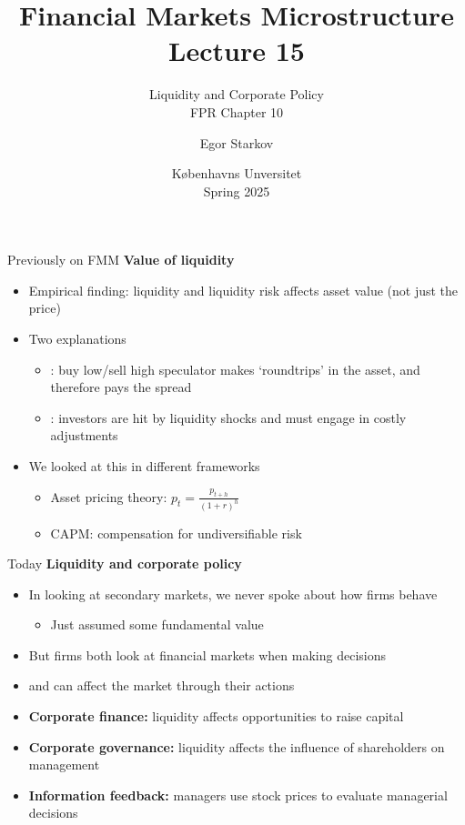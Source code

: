 \documentclass[english,10pt
,aspectratio=169
]{beamer}
\title{Financial Markets Microstructure \\ Lecture 15}
\subtitle{Liquidity and Corporate Policy \\ FPR Chapter 10}
\author{Egor Starkov}
\date{K{\o}benhavns Unversitet \\
	Spring 2025}
\begin{document}
\frame[plain]{\titlepage}


\begin{frame}{Previously on FMM}
	\textbf{Value of liquidity}
	\begin{itemize}
		\item Empirical finding: liquidity and liquidity risk affects asset value (not just the price)
		\item Two explanations
		\begin{itemize}
			\item {}: buy low/sell high speculator makes `roundtrips' in the asset, and therefore pays the spread
			\item {}: investors are hit by liquidity shocks and must engage in costly adjustments
		\end{itemize}
		\item We looked at this in different frameworks
		\begin{itemize}
			\item \alert{Asset pricing theory}: $p_{t}= \frac{p_{t+h}}{(1+r)^{h}}$
			\item \alert{CAPM}: compensation for undiversifiable risk
		\end{itemize}
	\end{itemize}
\end{frame}


\begin{frame}{Today}
	\textbf{Liquidity and corporate policy}
	\begin{itemize}
		\item In looking at secondary markets, we never spoke about how firms behave
		\begin{itemize}
			\item Just assumed some fundamental value
		\end{itemize}
		\item But firms both look at financial markets when making decisions
		\item and can affect the market through their actions
		\pause\bigskip 
		\item \textbf{Corporate finance:} liquidity affects opportunities to raise capital
		\item \textbf{Corporate governance:} liquidity affects the influence of shareholders on management
		\item \textbf{Information feedback:} managers use stock prices to evaluate managerial decisions
	\end{itemize}
\end{frame}
\end{document}
